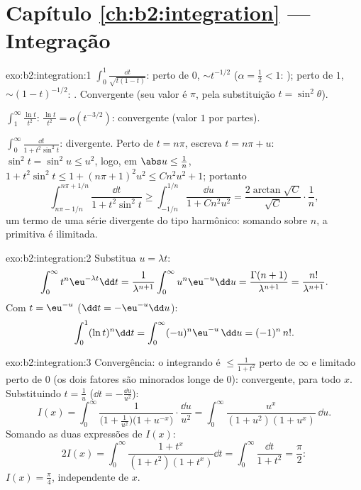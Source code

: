 \section*{Capítulo \ref{ch:b2:integration} --- Integração}

\begin{solution}{exo:b2:integration:1}
$\int_0^1 \frac{\dd t}{\sqrt{t(1-t)}}$: perto de $0$, $\sim t^{-1/2}$
($\alpha = \frac12 < 1$: ); perto de $1$, $\sim
(1-t)^{-1/2}$: . Convergente (seu valor é $\pi$, pela
substituição $t = \sin^2\theta$).

$\int_1^\infty \frac{\ln t}{t^2}$: $\frac{\ln t}{t^2} = o(t^{-3/2})$:
convergente (valor $1$ por partes).

$\int_0^\infty \frac{\dd t}{1 + t^2\sin^2 t}$: divergente. Perto de $t =
n\pi$, escreva $t = n\pi + u$: $\sin^2 t = \sin^2 u \leq u^2$, logo, em
$\abs u \leq \frac{1}{n}$, $1 + t^2\sin^2 t \leq 1 + (n\pi +
1)^2u^2 \leq C n^2 u^2 + 1$; portanto
\[
\int_{n\pi - 1/n}^{n\pi + 1/n} \frac{\dd t}{1 + t^2\sin^2 t}
\geq \int_{-1/n}^{1/n} \frac{\dd u}{1 + Cn^2u^2}
= \frac{2\arctan\sqrt C}{\sqrt C}\cdot\frac{1}{n} ,
\]
um termo de uma série divergente do tipo harmônico: somando sobre $n$, a
primitiva é ilimitada.
\end{solution}

\begin{solution}{exo:b2:integration:2}
Substitua $u = \lambda t$:
\[
\int_0^\infty t^n \eu^{-\lambda t}\dd t
= \frac{1}{\lambda^{n+1}}\int_0^\infty u^n\eu^{-u}\dd u
= \frac{\Gamma(n+1)}{\lambda^{n+1}} = \frac{n!}{\lambda^{n+1}} .
\]
Com $t = \eu^{-u}$ ($\dd t = -\eu^{-u}\dd u$):
\[
\int_0^1 (\ln t)^n \dd t = \int_0^{\infty} (-u)^n \eu^{-u}\,\dd u
= (-1)^n\, n! .
\]
\end{solution}

\begin{solution}{exo:b2:integration:3}
Convergência: o integrando é $\leq \frac{1}{1+t^2}$ perto de $\infty$
e limitado perto de $0$ (os dois fatores são minorados longe de $0$):
 convergente, para todo $x$. Substituindo $t = \frac1u$
($\dd t = -\frac{\dd u}{u^2}$):
\[
I(x) = \int_0^\infty \frac{1}{\bigl(1 +
\frac1{u^2}\bigr)\bigl(1 + u^{-x}\bigr)}\cdot\frac{\dd u}{u^2}
= \int_0^\infty \frac{u^x}{(1 + u^2)(1 + u^x)}\,\dd u .
\]
Somando as duas expressões de $I(x)$:
\[
2I(x) = \int_0^\infty \frac{1 + t^x}{(1+t^2)(1+t^x)}\dd t
= \int_0^\infty \frac{\dd t}{1 + t^2} = \frac{\pi}{2} :
\]
$I(x) = \frac\pi4$, independente de $x$.
\end{solution}

